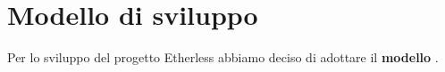 \section{Modello di sviluppo}
Per lo sviluppo del progetto Etherless abbiamo deciso di adottare il \textbf{modello }.
